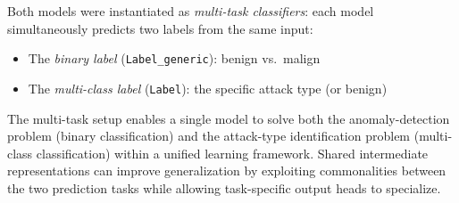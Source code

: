 \documentclass[../main.tex]{subfiles}
\begin{document}
Both models were instantiated as \emph{multi-task classifiers}: each model simultaneously predicts two labels from the same input:
\begin{itemize}
    \item The \emph{binary label} (\texttt{Label\_generic}): benign vs.\ malign
    \item The \emph{multi-class label} (\texttt{Label}): the specific attack type (or benign)
\end{itemize}

The multi-task setup enables a single model to solve both the anomaly-detection problem (binary classification) and the attack-type identification problem (multi-class classification) within a unified learning framework.  Shared intermediate representations can improve generalization by exploiting commonalities between the two prediction tasks while allowing task-specific output heads to specialize.
\end{document}
